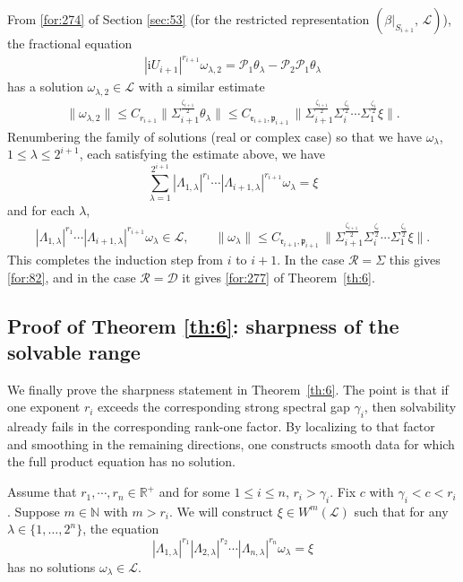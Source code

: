 \documentclass[11 pt]{amsart}
\newcommand{\NN}{\mathbb{N}}
\newcommand{\RR}{\mathbb{R}}
\newcommand{\norm}[1]{\lVert#1\rVert}
\theoremstyle{definition}
\numberwithin{equation}{section}
\begin{document}
From \eqref{for:274} of Section \ref{sec:53} (for the restricted representation $(\beta|_{S_{i+1}},\,\mathcal{L})$), the fractional equation
\begin{align*}
    |\textrm{i}U_{i+1}|^{r_{i+1}}\omega_{\lambda,2}=\mathcal{P}_1\theta_\lambda-\mathcal{P}_2\mathcal{P}_1\theta_\lambda
  \end{align*}
  has a solution $\omega_{\lambda,2}\in \mathcal{L}$ with a similar estimate
  \begin{align*}
 \norm{\omega_{\lambda,2}}\leq C_{r_{i+1}}\big\|\Sigma_{i+1}^{\frac{\zeta_{i+1}}{2}}\theta_\lambda\big\|\leq C_{\mathfrak{r}_{i+1},\mathfrak{p}_{i+1}}\,
     \big\|\Sigma_{i+1}^{\frac{\zeta_{i+1}}{2}}\Sigma_i^{\frac{\zeta_i}{2}}\cdots\Sigma_1^{\frac{\zeta_1}{2}}\xi\big\|.
\end{align*}
Renumbering the family of solutions (real or complex case) so that
we have \(\omega_\lambda\), \(1\le\lambda\le 2^{i+1}\), each satisfying the
estimate above, we have
\[
  \sum_{\lambda=1}^{2^{i+1}}
  |\Lambda_{1,\lambda}|^{r_1}\cdots |\Lambda_{i+1,\lambda}|^{r_{i+1}}\omega_{\lambda}=\xi
\]
and for each $\lambda$,
\begin{align*}
 |\Lambda_{1,\lambda}|^{r_1}\cdots |\Lambda_{i+1,\lambda}|^{r_{i+1}}\omega_{\lambda}\in \mathcal{L},
  \qquad
  \|\omega_{\lambda}\|
  \le C_{\mathfrak{r}_{i+1},\mathfrak{p}_{i+1}}\,
     \big\|\Sigma_{i+1}^{\frac{\zeta_{i+1}}{2}}\Sigma_i^{\frac{\zeta_i}{2}}\cdots\Sigma_1^{\frac{\zeta_1}{2}}\xi\big\|.
\end{align*}
This completes the induction step from $i$ to $i+1$. In the case $\mathcal R=\Sigma$ this gives
\eqref{for:82}, and in the case $\mathcal R=\mathcal D$ it gives
\eqref{for:277} of Theorem~\ref{th:6}.

\subsection{Proof of Theorem \ref{th:6}: sharpness of the solvable range}

We finally prove the sharpness statement in Theorem~\ref{th:6}. The point is
that if one exponent $r_i$ exceeds the corresponding strong spectral gap
$\gamma_i$, then solvability already fails in the corresponding rank-one
factor. By localizing to that factor and smoothing in the remaining
directions, one constructs smooth data for which the full product equation has
no solution.

Assume that $r_1,\cdots, r_n\in \RR^+$ and
for some $1\le i\le n$, $r_i>\gamma_i$. Fix $c$ with $\gamma_i < c < r_i$.  Suppose $m\in\NN$ with $m>r_i$. We will construct $\xi\in W^m(\mathcal L)$ such that for any $\lambda\in\{1,\dots,2^n\}$,
the equation
\[
 |\Lambda_{1,\lambda}|^{r_1}|\Lambda_{2,\lambda}|^{r_2}\cdots |\Lambda_{n,\lambda}|^{r_n}\omega_\lambda = \xi
\]
has no solutions $\omega_\lambda\in\mathcal L$.
\end{document}
